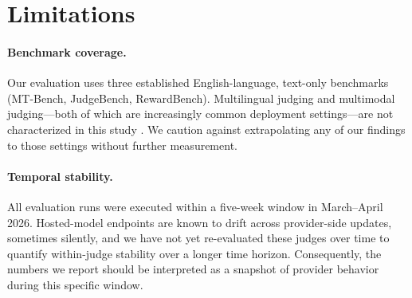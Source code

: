 \documentclass[11pt]{article}
\begin{document}
\clearpage
\section*{Limitations}


\paragraph{Benchmark coverage.} Our evaluation uses three established
English-language, text-only benchmarks (MT-Bench, JudgeBench,
RewardBench). Multilingual judging and multimodal judging---both of
which are increasingly common deployment settings---are not
characterized in this study \citep{fu-liu-2025-reliable}. We caution against extrapolating any
of our findings to those settings without further measurement.

\paragraph{Temporal stability.} All evaluation runs were executed
within a five-week window in March--April 2026. Hosted-model
endpoints are known to drift across provider-side updates, sometimes
silently, and we have not yet re-evaluated these judges over time to
quantify within-judge stability over a longer time horizon. Consequently, the numbers we
report should be interpreted as a snapshot of provider behavior during this specific window.
\end{document}

